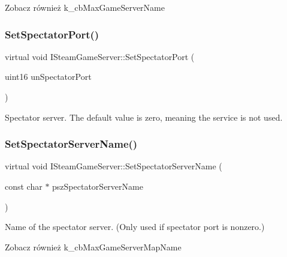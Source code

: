 \begin{DoxySeeAlso}{Zobacz również}
k\+\_\+cb\+Max\+Game\+Server\+Name 
\end{DoxySeeAlso}
\mbox{\label{class_i_steam_game_server_a7057995594c62bb0c20d7c52c684380e}} 
\subsubsection{\texorpdfstring{Set\+Spectator\+Port()}{SetSpectatorPort()}}
{\footnotesize\ttfamily virtual void I\+Steam\+Game\+Server\+::\+Set\+Spectator\+Port (\begin{DoxyParamCaption}\item[{uint16}]{un\+Spectator\+Port }\end{DoxyParamCaption})\hspace{0.3cm}{\ttfamily [pure virtual]}}

Spectator server. The default value is zero, meaning the service is not used. \mbox{\label{class_i_steam_game_server_a076fbd010db81fc49b64db24d83d02d7}} 
\subsubsection{\texorpdfstring{Set\+Spectator\+Server\+Name()}{SetSpectatorServerName()}}
{\footnotesize\ttfamily virtual void I\+Steam\+Game\+Server\+::\+Set\+Spectator\+Server\+Name (\begin{DoxyParamCaption}\item[{const char $\ast$}]{psz\+Spectator\+Server\+Name }\end{DoxyParamCaption})\hspace{0.3cm}{\ttfamily [pure virtual]}}

Name of the spectator server. (Only used if spectator port is nonzero.)

\begin{DoxySeeAlso}{Zobacz również}
k\+\_\+cb\+Max\+Game\+Server\+Map\+Name 
\end{DoxySeeAlso}
\mbox{\label{class_i_steam_game_server_a07da94c7bc216698683cd567cde93fb3}} 
